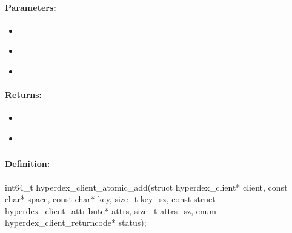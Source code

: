 \paragraph{Parameters:}
\begin{itemize}[noitemsep]
\item {}\\

\item {}\\

\item {}\\

\end{itemize}

\paragraph{Returns:}
\begin{itemize}[noitemsep]
\item {}\\

\item {}\\

\end{itemize}

\pagebreak
\subsubsection{}
\label{api:c:atomic_add}


\paragraph{Definition:}
\begin{ccode}
int64_t hyperdex_client_atomic_add(struct hyperdex_client* client,
        const char* space,
        const char* key, size_t key_sz,
        const struct hyperdex_client_attribute* attrs, size_t attrs_sz,
        enum hyperdex_client_returncode* status);
\end{ccode}

